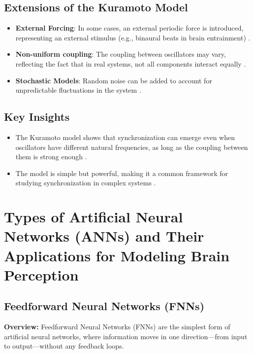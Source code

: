 \documentclass{article}
\begin{document}
\subsection*{Extensions of the Kuramoto Model}
\begin{itemize}
    \item \textbf{External Forcing}: In some cases, an external periodic force is introduced, representing an external stimulus (e.g., binaural beats in brain entrainment) \cite{kennel2010binaural, jirakittayakorn2017brain}.
    \item \textbf{Non-uniform coupling}: The coupling between oscillators may vary, reflecting the fact that in real systems, not all components interact equally \cite{thompson2003neurofeedback}.
    \item \textbf{Stochastic Models}: Random noise can be added to account for unpredictable fluctuations in the system \cite{gao2014analysis}.
\end{itemize}

\subsection*{Key Insights}
\begin{itemize}
    \item The Kuramoto model shows that synchronization can emerge even when oscillators have different natural frequencies, as long as the coupling between them is strong enough \cite{draganova2008cortical, chaieb2015auditory}.
    \item The model is simple but powerful, making it a common framework for studying synchronization in complex systems \cite{kennel2010binaural}.
\end{itemize}

\section{Types of Artificial Neural Networks (ANNs) and Their Applications for Modeling Brain Perception}

\subsection{Feedforward Neural Networks (FNNs)}

\textbf{Overview:} Feedforward Neural Networks (FNNs) are the simplest form of artificial neural networks, where information moves in one direction—from input to output—without any feedback loops. 
\end{document}

